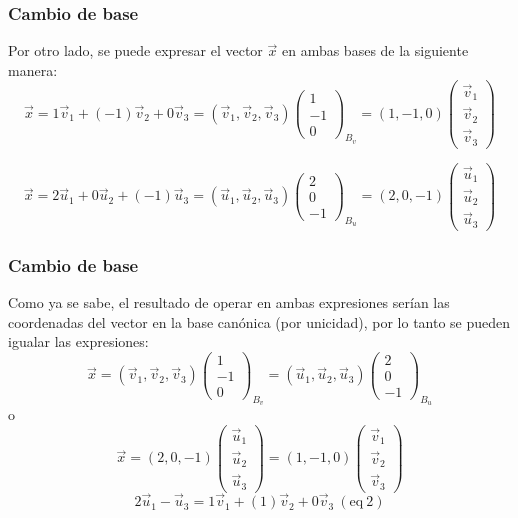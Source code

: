 \documentclass{beamer}
\begin{document}
   \begin{frame}
  \frametitle{Cambio de base}
Por otro lado, se puede expresar el vector $\vec x$ en ambas bases de la siguiente manera:
\[\vec x = 1\vec v_1 +(-1)\vec v_2+0\vec v_3 = (\vec v_1,\vec v_2, \vec v_3) \left(\begin{array}{c}1\\-1\\0\end{array}\right)_{B_v} = (1,-1, 0) \left(\begin{array}{c}\vec v_1\\ \vec v_2\\ \vec v_3\end{array}\right)\]

\[\vec x = 2\vec u_1 +0\vec u_2+(-1)\vec u_3 = (\vec u_1,\vec u_2, \vec u_3) \left(\begin{array}{c}2\\0\\-1\end{array}\right)_{B_u} = (2,0,-1) \left(\begin{array}{c}\vec u_1\\ \vec u_2\\ \vec u_3\end{array}\right)\]

\end{frame}


  \begin{frame}
  \frametitle{Cambio de base}
Como ya se sabe, el resultado de operar en ambas expresiones ser\'ian las coordenadas del vector en la base can\'onica (por unicidad), por lo tanto se pueden igualar las expresiones:
\[\vec x =  (\vec v_1,\vec v_2, \vec v_3) \left(\begin{array}{c}1\\-1\\0\end{array}\right)_{B_v} =  
(\vec u_1,\vec u_2, \vec u_3) \left(\begin{array}{c}2\\0\\-1\end{array}\right)_{B_u}\]
o
\[\vec x  = (2,0,-1) \left(\begin{array}{c}\vec u_1\\ \vec u_2\\ \vec u_3\end{array}\right) = 
(1,-1, 0) \left(\begin{array}{c}\vec v_1\\ \vec v_2\\ \vec v_3\end{array}\right)
\]
\[2\vec u_1-\vec u_3 = 1\vec v_1+(1)\vec v_2+0\vec v_3\ \mathrm{(eq\ 2)}\]
\end{frame}
\end{document}
